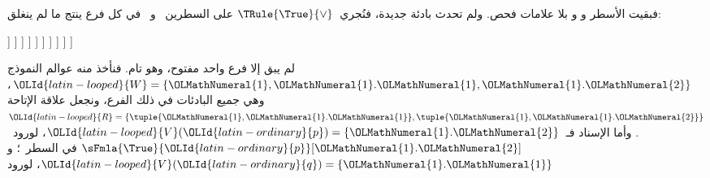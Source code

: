\documentclass[../../../include/open-logic-section]{subfiles}
\begin{document}
{\begin{ex}
  فبقيت الأسطر  و و بلا علامات فحص. ولم تحدث بادئة جديدة،
  فنُجري~$\TRule{\True}{\lor}$ على السطرين~ و~ في كل فرع
  ينتج ما لم ينغلق:
  \begin{oltableau}
    [\pFmla{\False}{\Box(p \lor q) \lif (\Box p \lor \Box q)}{1},
      just = \TAss, checked
      [\pFmla{\True}{\Box(p \lor q)}{1},
        just = {\TRule{\False}{\lif}[1]}, checked
        [\pFmla{\False}{\Box p \lor \Box q}{1},
          just = {\TRule{\False}{\lif}[1]}, checked
          [\pFmla{\False}{\Box p}{1},
            just = {\TRule{\False}{\lor}[3]}, checked
            [\pFmla{\False}{\Box q}{1},
              just = {\TRule{\False}{\lor}[3]}, checked
              [\pFmla{\False}{p}{1.1}, 
                just = {\TRule{\False}{\Box}[4]}, checked
                [\pFmla{\False}{q}{1.2}, 
                  just = {\TRule{\False}{\Box}[5]}, checked
                  [\pFmla{\True}{p \lor q}{1.1}, 
                    just = {\TRule{\True}{\Box}[2]}, checked
                    [\pFmla{\True}{p \lor q}{1.2}, 
                      just = {\TRule{\True}{\Box}[2]}, checked
                      [\pFmla{\True}{p}{1.1},
                        just = {\TRule{\True}{\lor}[8]}, checked, close
                      ]
                      [\pFmla{\True}{q}{1.1},
                        just = {\TRule{\True}{\lor}[8]}, checked
                        [\pFmla{\True}{p}{1.2},
                          just = {\TRule{\True}{\lor}[9]}, checked]
                        [\pFmla{\True}{q}{1.2},
                          just = {\TRule{\True}{\lor}[9]}, checked, close]
                      ]
                    ]
                  ]
                ]
              ]
            ]
          ]
        ]
      ]
    ]
  \end{oltableau}
  لم يبق إلا فرع واحد مفتوح، وهو تام. فنأخذ منه عوالم النموذج
  $\OLId{latin-looped}{W} = \{\OLMathNumeral{1}, \OLMathNumeral{1}.\OLMathNumeral{1}, \OLMathNumeral{1}.\OLMathNumeral{2}\}$، وهي جميع البادئات في ذلك الفرع،
  ونجعل علاقة الإتاحة
  $\OLId{latin-looped}{R} = \{\tuple{\OLMathNumeral{1}, \OLMathNumeral{1}.\OLMathNumeral{1}}, \tuple{\OLMathNumeral{1}, \OLMathNumeral{1}.\OLMathNumeral{2}}\}$.
  وأما الإسناد فـ~$\OLId{latin-looped}{V}(\OLId{latin-ordinary}{p}) =
  \{\OLMathNumeral{1}.\OLMathNumeral{2}\}$، لورود~$\sFmla{\True}{\OLId{latin-ordinary}{p}}[\OLMathNumeral{1}.\OLMathNumeral{2}]$ في السطر~؛
  و$\OLId{latin-looped}{V}(\OLId{latin-ordinary}{q}) = \{\OLMathNumeral{1}.\OLMathNumeral{1}\}$، لورود

\end{ex}}
\end{document}
